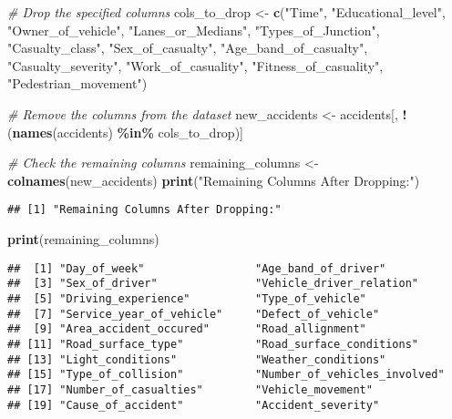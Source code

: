 \documentclass[
]{article}
\newenvironment{Shaded}{\begin{snugshade}}{\end{snugshade}}
\newcommand{\CommentTok}[1]{\textcolor[rgb]{0.56,0.35,0.01}{\textit{#1}}}
\newcommand{\FunctionTok}[1]{\textcolor[rgb]{0.13,0.29,0.53}{\textbf{#1}}}
\newcommand{\NormalTok}[1]{#1}
\newcommand{\OtherTok}[1]{\textcolor[rgb]{0.56,0.35,0.01}{#1}}
\newcommand{\SpecialCharTok}[1]{\textcolor[rgb]{0.81,0.36,0.00}{\textbf{#1}}}
\newcommand{\StringTok}[1]{\textcolor[rgb]{0.31,0.60,0.02}{#1}}
\begin{document}
\begin{Shaded}
\begin{Highlighting}[]
\CommentTok{\# Drop the specified columns}
\NormalTok{cols\_to\_drop }\OtherTok{\textless{}{-}} \FunctionTok{c}\NormalTok{(}\StringTok{"Time"}\NormalTok{, }\StringTok{"Educational\_level"}\NormalTok{, }\StringTok{"Owner\_of\_vehicle"}\NormalTok{, }\StringTok{"Lanes\_or\_Medians"}\NormalTok{, }
                  \StringTok{"Types\_of\_Junction"}\NormalTok{, }\StringTok{"Casualty\_class"}\NormalTok{, }\StringTok{"Sex\_of\_casualty"}\NormalTok{, }
                  \StringTok{"Age\_band\_of\_casualty"}\NormalTok{, }\StringTok{"Casualty\_severity"}\NormalTok{, }\StringTok{"Work\_of\_casuality"}\NormalTok{, }
                  \StringTok{"Fitness\_of\_casuality"}\NormalTok{, }\StringTok{"Pedestrian\_movement"}\NormalTok{)}

\CommentTok{\# Remove the columns from the dataset}
\NormalTok{new\_accidents }\OtherTok{\textless{}{-}}\NormalTok{ accidents[, }\SpecialCharTok{!}\NormalTok{(}\FunctionTok{names}\NormalTok{(accidents) }\SpecialCharTok{\%in\%}\NormalTok{ cols\_to\_drop)]}

\CommentTok{\# Check the remaining columns}
\NormalTok{remaining\_columns }\OtherTok{\textless{}{-}} \FunctionTok{colnames}\NormalTok{(new\_accidents)}
\FunctionTok{print}\NormalTok{(}\StringTok{"Remaining Columns After Dropping:"}\NormalTok{)}
\end{Highlighting}
\end{Shaded}

\begin{verbatim}
## [1] "Remaining Columns After Dropping:"
\end{verbatim}

\begin{Shaded}
\begin{Highlighting}[]
\FunctionTok{print}\NormalTok{(remaining\_columns)}
\end{Highlighting}
\end{Shaded}

\begin{verbatim}
##  [1] "Day_of_week"                 "Age_band_of_driver"         
##  [3] "Sex_of_driver"               "Vehicle_driver_relation"    
##  [5] "Driving_experience"          "Type_of_vehicle"            
##  [7] "Service_year_of_vehicle"     "Defect_of_vehicle"          
##  [9] "Area_accident_occured"       "Road_allignment"            
## [11] "Road_surface_type"           "Road_surface_conditions"    
## [13] "Light_conditions"            "Weather_conditions"         
## [15] "Type_of_collision"           "Number_of_vehicles_involved"
## [17] "Number_of_casualties"        "Vehicle_movement"           
## [19] "Cause_of_accident"           "Accident_severity"
\end{verbatim}
\end{document}
